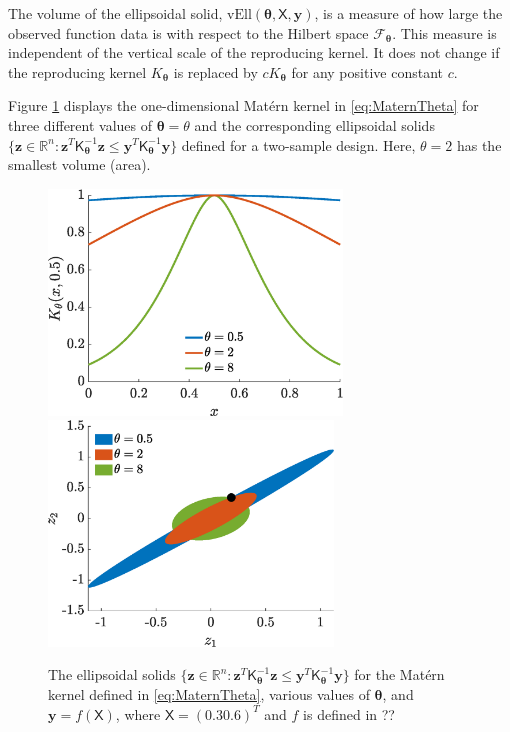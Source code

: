 \documentclass[]{mcom-l}
\theoremstyle{remark}
\newcommand{\vEll}{\text{vEll}}
\newcommand{\reals}{{\mathbb{R}}}
\newcommand{\mK}{\mathsf{K}}
\newcommand{\mX}{\mathsf{X}}
\newcommand{\by}{{\boldsymbol{y}}}
\newcommand{\bz}{{\boldsymbol{z}}}
\newcommand{\btheta}{{\boldsymbol{\theta}}}
\newcommand{\calf}{{\mathcal{F}}}
\begin{document}
The volume of the ellipsoidal solid, $\vEll(\btheta,\mX,\by)$, is a measure of how large the observed function data is with respect to the Hilbert space $\calf_{\btheta}$.  This measure is independent of the vertical scale of the reproducing kernel.  It does not change if the reproducing kernel $K_\btheta$ is replaced by $cK_{\btheta}$ for any positive constant $c$.  

Figure \ref{fig:ellipPlot} displays the one-dimensional Mat\'ern kernel in \eqref{eq:MaternTheta} for three different values of $\btheta = \theta$ and the corresponding  ellipsoidal solids $\{ \bz \in \reals^n : \bz^T \mK_\btheta^{-1} \bz \le \by^T \mK_\btheta^{-1} \by  \bigr \}$  defined for a two-sample design.  Here, $\theta = 2$ has the smallest volume (area).


\begin{figure}[H]
	\centering
	\includegraphics[height = 6cm]{ProgramsImages/KthetaPlot.eps} \qquad
	\includegraphics[height = 6cm]{ProgramsImages/ellipsesPlot.eps}
	\caption{The ellipsoidal solids $\{ \bz \in \reals^n : \bz^T \mK_\btheta^{-1} \bz \le \by^T \mK_\btheta^{-1} \by  \bigr \}$ for the Mat\'ern kernel defined in \eqref{eq:MaternTheta}, various values of $\btheta$, and $\by = f(\mX)$, where $\mX = (0.3 0.6)^T$ and $f$ is defined in ?? \label{fig:ellipPlot}}
\end{figure}
\end{document}
